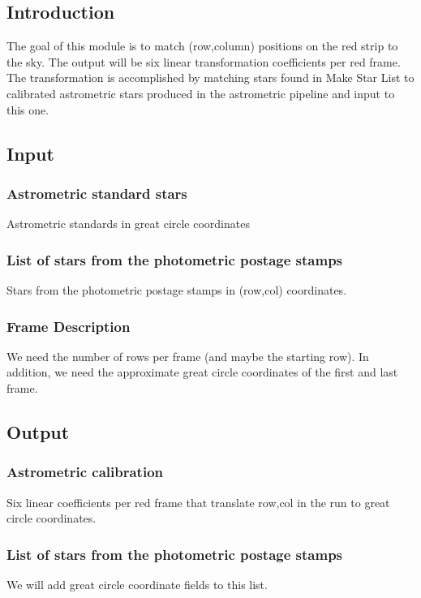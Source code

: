 
\subsection{Introduction}

The goal of this module is to match (row,column) positions on the red strip
to the sky.  The output will be six linear transformation coefficients per
red frame.  The transformation is accomplished by matching stars found in
Make Star List to calibrated astrometric stars produced in the astrometric
pipeline and input to this one.

\subsection{Input}

\subsubsection{Astrometric standard stars}
Astrometric standards in great circle coordinates
\subsubsection{List of stars from the photometric postage stamps}
Stars from the photometric postage stamps in (row,col) coordinates.
\subsubsection{Frame Description}
We need the number of rows per frame (and maybe the starting row).
In addition, we need the approximate great circle coordinates of the
first and last frame.
\subsection{Output}
\subsubsection{Astrometric calibration}
Six linear coefficients per red frame that translate row,col in the run
to great circle coordinates.
\subsubsection{List of stars from the photometric postage stamps}
We will add great circle coordinate fields to this list.
